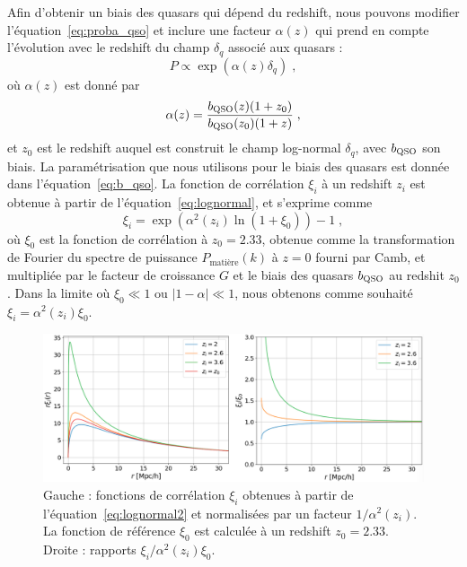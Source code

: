 Afin d'obtenir un biais des quasars qui dépend du redshift, nous pouvons modifier l'équation~\ref{eq:proba_qso} et inclure une facteur $\alpha(z)$ qui prend en compte l'évolution avec le redshift du champ $\delta_q$ associé aux quasars :
\begin{equation}
  \label{eq:proba_qso2}
  P \propto \exp(\alpha(z)\delta_q) \; ,
\end{equation}
où $\alpha(z)$ est donné par
\begin{equation}
  \alpha(z) = \frac{b_{\textsc{QSO}}(z) (1+z_0)}{b_{\textsc{QSO}}(z_0)(1+z)} \; ,
\end{equation}
et $z_0$ est le redshift auquel est construit le champ log-normal $\delta_q$, avec $b_{\textsc{QSO}}$ son biais.
  La paramétrisation que nous utilisons pour le biais des quasars est donnée dans l'équation~\ref{eq:b_qso}.
  La fonction de corrélation $\xi_i$ à un redshift $z_i$ est obtenue à partir de l'équation~\ref{eq:lognormal}, et s'exprime comme
  \begin{equation}
    \label{eq:lognormal2}
    \xi_i = \exp(\alpha^2(z_i) \ln (1 + \xi_0)) - 1 \; ,
  \end{equation}
  où $\xi_0$ est la fonction de corrélation à $z_0 = \num{2.33}$, obtenue comme la transformation de Fourier du spectre de puissance $P_{\mathrm{matière}}(k)$ à $z=0$ fourni par Camb, et multipliée par le facteur de croissance $G$ et le biais des quasars $b_{\textsc{QSO}}$ au redshit $z_0$.
  Dans la limite où $\xi_0 \ll 1$ ou $|1 - \alpha | \ll 1$, nous obtenons comme souhaité $\xi_i = \alpha^2(z_i) \xi_0$.
\begin{figure}
  \centering
  \includegraphics[scale=0.4]{qsolognormal1}
  \caption{Gauche : fonctions de corrélation $\xi_i$ obtenues à partir de l'équation~\ref{eq:lognormal2} et normalisées par un facteur $1 / \alpha^2(z_i)$. La fonction de référence $\xi_0$ est calculée à un redshift $z_0 = \num{2.33}$. Droite : rapports $\xi_i / \alpha^2(z_i) \xi_0$.}
  \label{fig:qsolognormal1}
\end{figure}
